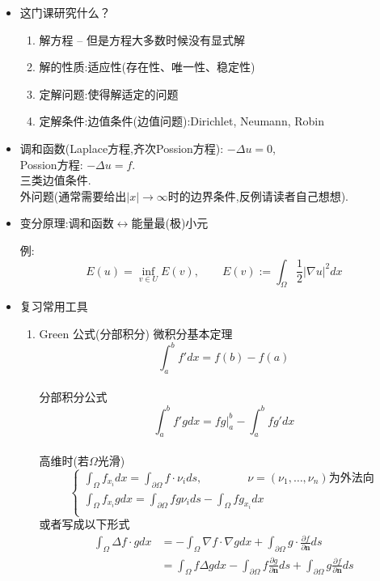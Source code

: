 \documentclass[12pt, a4paper]{article}
\begin{document}
    \begin{itemize}
        \item 这门课研究什么？
        \begin{enumerate}
            \item 解方程 -- 但是方程大多数时候没有显式解
            \item 解的性质:适应性(存在性、唯一性、稳定性)
            \item 定解问题:使得解适定的问题
            \item 定解条件:边值条件(边值问题):Dirichlet, Neumann, Robin
        \end{enumerate}
        \item 调和函数(Laplace方程,齐次Possion方程): $-\Delta u = 0$,\\ Possion方程: $-\Delta u = f$.\\ 三类边值条件.\\ 外问题(通常需要给出$|x|\rightarrow\infty$时的边界条件,反例请读者自己想想).
        \item 变分原理:调和函数$\leftrightarrow$能量最(极)小元
        
        例:$$E(u) = \mathop{\inf}_{v\in U} E(v), \qquad E(v) := \int_{\Omega} \frac12 | \nabla u |^2 dx$$
        \item 复习常用工具
        \begin{enumerate}
            \item Green 公式(分部积分)
            微积分基本定理$$\int_a^bf'dx = f(b) - f(a)$$ \\
            分部积分公式$$\int_a^bf'gdx = fg\Big|_a^b - \int_a^bfg'dx$$\\
            高维时(若$\Omega$光滑)
            $$ \begin{cases}
                \int_{\Omega} f_{x_i}dx = \int_{\partial \Omega}f \cdot \nu_i ds, \qquad\qquad \nu = (\nu_1, \dots, \nu_n) \text{为外法向} \\
                \int_{\Omega} f_{x_i}gdx = \int_{\partial \Omega}fg\nu_ids - \int_{\Omega}fg_{x_i}dx \\
                \end{cases}$$
            或者写成以下形式
            \begin{align*} 
            \int_{\Omega} \Delta f \cdot g dx &= - \int_{\Omega} \nabla f \cdot \nabla g dx + \int_{\partial \Omega} g \cdot \frac{\partial f}{\partial \bm{n}} ds \\
            &= \int_{\Omega} f \Delta g dx - \int_{\partial \Omega} f \frac{\partial g}{\partial\bm{n}}ds + \int_{\partial \Omega} g \frac{\partial f}{\partial\bm{n}}ds
            \end{align*}
            

\end{enumerate}
\end{itemize}
\end{document}
